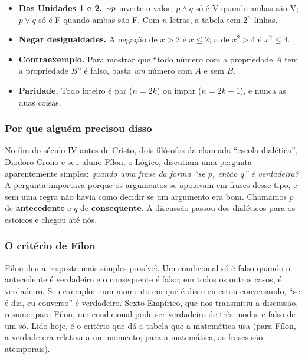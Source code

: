 \begin{minimo}
\begin{itemize}[leftmargin=1.2em]
  \item \textbf{Das Unidades 1 e 2.} ${{\sim}}p$ inverte o valor; $p\wedge q$ só é V quando ambas são V; $p\vee q$ só é F quando ambas são F. Com $n$ letras, a tabela tem $2^n$ linhas.
  \item \textbf{Negar desigualdades.} A negação de $x>2$ é $x\le 2$; a de $x^2>4$ é $x^2\le 4$.
  \item \textbf{Contraexemplo.} Para mostrar que \enquote{todo número com a propriedade $A$ tem a propriedade $B$} é falso, basta \emph{um} número com $A$ e sem $B$.
  \item \textbf{Paridade.} Todo inteiro é par ($n=2k$) ou ímpar ($n=2k+1$), e nunca as duas coisas.
\end{itemize}
\end{minimo}

\DeOndeVem

\subsubsection{Por que alguém precisou disso}
No fim do século IV antes de Cristo, dois filósofos da chamada \enquote{escola dialética}, Diodoro Crono e seu aluno Fílon, o Lógico, discutiam uma pergunta aparentemente simples: \emph{quando uma frase da forma \enquote{se $p$, então $q$} é verdadeira?} A pergunta importava porque os argumentos se apoiavam em frases desse tipo, e sem uma regra não havia como decidir se um argumento era bom. Chamamos $p$ de \textbf{antecedente} e $q$ de \textbf{consequente}. A discussão passou dos dialéticos para os estoicos e chegou até nós.

\subsubsection{O critério de Fílon}
Fílon deu a resposta mais simples possível. Um condicional só é falso quando o antecedente é verdadeiro e o consequente é falso; em todos os outros casos, é verdadeiro. Seu exemplo: num momento em que é dia e eu estou conversando, \enquote{se é dia, eu converso} é verdadeiro. Sexto Empírico, que nos transmitiu a discussão, resume: para Fílon, um condicional pode ser verdadeiro de três modos e falso de um só. Lido hoje, é o critério que dá a tabela que a matemática usa (para Fílon, a verdade era relativa a um momento; para a matemática, as frases são atemporais).

